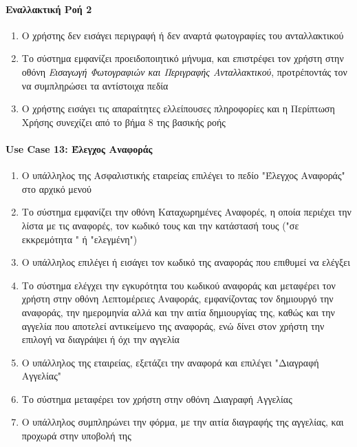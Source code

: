\documentclass{../ol-softwaremanual}
\begin{document}
	\paragraph{Εναλλακτική Ροή 2}
	
	\begin{enumerate}
			\item Ο χρήστης δεν εισάγει περιγραφή ή δεν αναρτά φωτογραφίες του ανταλλακτικού
			\item Το σύστημα εμφανίζει προειδοποιητικό μήνυμα, και επιστρέφει τον χρήστη στην οθόνη \textit{Εισαγωγή Φωτογραφιών και Περιγραφής Ανταλλακτικού}, προτρέποντάς τον να συμπληρώσει τα αντίστοιχα πεδία
			\item Ο χρήστης εισάγει τις απαραίτητες ελλείπουσες πληροφορίες και η Περίπτωση Χρήσης συνεχίζει από το βήμα 8 της βασικής ροής
	\end{enumerate}
	
	
	\paragraph{\en Use Case 13: \gr Έλεγχος Αναφοράς}  
	\begin{enumerate}
		\item Ο υπάλληλος της Ασφαλιστικής εταιρείας επιλέγει το πεδίο \en"\gr Έλεγχος Αναφοράς\en" \gr στο αρχικό μενού
		\item Το σύστημα εμφανίζει την οθόνη Καταχωρημένες Αναφορές, η οποία περιέχει την λίστα με τις αναφορές, τον κωδικό τους και την κατάστασή τους (\en"\gr σε εκκρεμότητα \en" \gr ή \en"\gr ελεγμένη\en"\gr)
		\item Ο υπάλληλος επιλέγει ή εισάγει τον κωδικό της αναφοράς που επιθυμεί να ελέγξει 
		\item Το σύστημα ελέγχει την εγκυρότητα του κωδικού αναφοράς και μεταφέρει τον χρήστη στην οθόνη Λεπτομέρειες Αναφοράς, εμφανίζοντας τον δημιουργό την αναφοράς, την ημερομηνία αλλά και την αιτία δημιουργίας της, καθώς και την αγγελία που αποτελεί αντικείμενο της αναφοράς, ενώ δίνει στον χρήστη την επιλογή να διαγράψει ή όχι την αγγελία
		\item Ο υπάλληλος της εταιρείας, εξετάζει την αναφορά και επιλέγει \en"\gr Διαγραφή Αγγελίας\en"\gr 
		\item Το σύστημα μεταφέρει τον χρήστη στην οθόνη Διαγραφή Αγγελίας
		\item Ο υπάλληλος συμπληρώνει την φόρμα, με την αιτία διαγραφής της αγγελίας, και προχωρά στην υποβολή της
	\end{enumerate}
	
\end{document}
